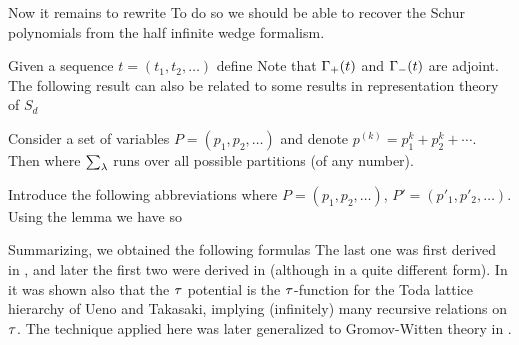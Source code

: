 \documentclass[../main/main.tex]{subfiles}
\begin{document}
Now it remains to rewrite
To do so we should be able to recover the Schur polynomials from the half infinite wedge formalism. 

Given a sequence $t=(t_1,t_2,\ldots)$ define
Note that $\Gamma_+(t)$ and $\Gamma_-(t)$ are adjoint. The following result can also be related to some results in representation theory of $S_d$
\begin{lemma}
	Consider a set of variables $P=(p_1,p_2,\ldots)$ and denote $p^{(k)}=p_1^k+p_2^k+\cdots$. Then
	where $\sum_\lambda$ runs over all possible partitions (of any number).
\end{lemma}
Introduce the following abbreviations
where $P=(p_1,p_2,\ldots)$, $P'=(p'_1,p'_2,\ldots)$. 
Using the lemma we have
so

Summarizing, we obtained the following formulas
The last one was first derived in \cite{O1}, and later the first two were derived in \cite{OP1} (although in a quite different form). In \cite{O1} it was shown also that the $\tau$ potential is the $\tau$-function for the Toda lattice hierarchy of Ueno and Takasaki, implying (infinitely) many recursive relations on $\tau$. The technique applied here was later generalized to Gromov-Witten theory in \cite{OP1,OP2}. 
\end{document}
